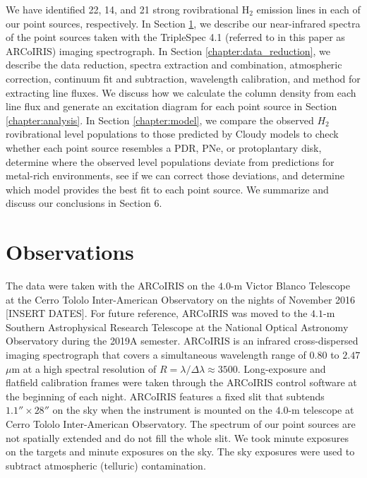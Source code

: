 \documentclass[12pt, letterpaper]{book}
\begin{document}
We have identified 22, 14, and 21 strong rovibrational $\textrm{H}_2$ emission lines in each of our point sources, respectively. In Section \ref{chapter:observations}, we describe our near-infrared spectra of the point sources taken with the TripleSpec 4.1 (referred to in this paper as ARCoIRIS) imaging spectrograph. In Section \ref{chapter:data_reduction}, we describe the data reduction, spectra extraction and combination, atmospheric correction, continuum fit and subtraction, wavelength calibration, and method for extracting line fluxes. We discuss how we calculate the column density from each line flux and generate an excitation diagram for each point source in Section \ref{chapter:analysis}. In Section \ref{chapter:model}, we compare the observed $H_2$ rovibrational level populations to those predicted by Cloudy models to check whether each point source resembles a PDR, PNe, or protoplantary disk, determine where the observed level populations deviate from predictions for metal-rich environments, see if we can correct those deviations, and determine which model provides the best fit to each point source. We summarize and discuss our conclusions in Section 6.

\chapter{Observations}
\label{chapter:observations}

The data were taken with the ARCoIRIS on the $4.0$-m Victor Blanco Telescope at the Cerro Tololo Inter-American Observatory on the nights of November 2016 [INSERT DATES]. For future reference, ARCoIRIS was moved to the $4.1$-m Southern Astrophysical Research Telescope at the National Optical Astronomy Observatory during the 2019A semester. ARCoIRIS is an infrared cross-dispersed imaging spectrograph that covers a simultaneous wavelength range of $0.80$ to $2.47$ $\mu$m at a high spectral resolution of $R = \lambda/\Delta\lambda \approx 3500$. Long-exposure and flatfield calibration frames were taken through the ARCoIRIS control software at the beginning of each night. ARCoIRIS features a fixed slit that subtends $1.1'' \times 28''$ on the sky when the instrument is mounted on the $4.0$-m telescope at Cerro Tololo Inter-American Observatory. The spectrum of our point sources are not spatially extended and do not fill the whole slit. We took minute exposures on the targets and minute exposures on the sky. The sky exposures were used to subtract atmospheric (telluric) contamination.
\end{document}
